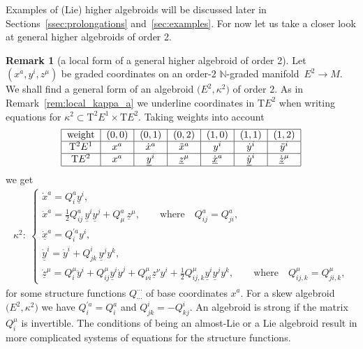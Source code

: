 \documentclass[pdftex]{sigma}
\newcommand{\grB}{{$\N$-graded manifold}}
\newcommand{\degree}{{order}}
\newcommand{\N}{\mathbb{N}}
\newcommand{\und}{\underline}
\newcommand{\ra}{\rightarrow}
\newcommand{\T}{\mathrm{T}} %
\newcommand{\TT}[1]{\mathrm{T}^{#1}} %
\numberwithin{equation}{section}
\theoremstyle{definition}
\newtheorem{rem}[thm]{Remark}
\begin{document}
Examples of (Lie) higher algebroids will be discussed later in Sections~\ref{ssec:prolongations} and~\ref{sec:examples}. For now let us take a closer look at general higher algebroids of order 2.
\begin{rem}[a local form of a general higher algebroid of order 2]\label{rem:local_order_2}
Let $(x^a, y^i, z^\mu)$ be graded coordinates on an \degree-$2$ \grB\ $E^2\ra M$.
We shall find a general form of an algebroid $\big(E^2, \kappa^2\big)$ of order $2$. As in Remark~\ref{rem:local_kappa_a} we underline coordinates in $\T E^2$ when writing equations for $\kappa^2\subset \TT{2} E^1 \times \T E^2$. Taking weights into account
\begin{gather}\label{e:T2E_TE2_weights}
\begin{tabular}{|c|c|c|c|c|c|c|}\hline
\text{weight}& $(0,0)$ & $(0,1)$ & $(0,2)$ & $(1,0)$ & $(1,1)$ & $(1,2)$ \\ \hline
$\TT{2} E^1$ & $x^a$ & $\dot{x}^a$ & $\ddot{x}^a$ & $y^i$ & $\dot{y}^i$ & $\ddot{y}^i$ \\ \hline
$\T E^2$ & $x^a$ & $\und{y}^i$ & $\und{z}^\mu$ & $\dot{\und{x}}^a$ & $\dot{\und{y}}^i$ & $\dot{\und{z}}^\mu$ \\ \hline
\end{tabular}
\end{gather}
we get
\begin{gather}\label{e:local_kappa2}
\kappa^2\colon \
\begin{cases}
\dot{x}^a = Q^a_i \und{y}^i, \\
\ddot{x}^a = \frac{1}{2} Q^a_{ij}\,\und{y}^i\und{y}^j + Q^a_\mu\,\und{z}^\mu, \qquad \text{where} \quad Q^a_{ij}=Q^a_{ji}, \\
\dot{\und{x}}^a = Q^{'a}_i y^i,\\
\dot{\und{y}}^i = \dot{y}^i + Q^i_{jk}\,\und{y}^j y^k,\\
\dot{\und{z}}^\mu = Q^\mu_i \ddot{y}^i + Q^\mu_{ij} \und{y}^i \dot{y}^j + Q^\mu_{\nu i}\und{z}^\nu y^i + \frac{1}{2} Q^\mu_{ij,k} \und{y}^i\und{y}^j y^k, \qquad \text{where} \quad Q^\mu_{ij,k}=Q^\mu_{ji,k},
\end{cases}
\end{gather}
for some structure functions $Q^{\cdots}_{\cdots}$ of base coordinates $x^a$. For a skew algebroid $\big(E^2, \kappa^2\big)$ we have $Q^{'a}_i= Q^a_i$ and $Q_{jk}^i = - Q_{kj}^i$. An algebroid is strong if the matrix $Q^\mu_i$ is invertible. The conditions of being an almost-Lie or a Lie algebroid result in more complicated systems of equations for the structure functions.
\end{rem}
\end{document}
